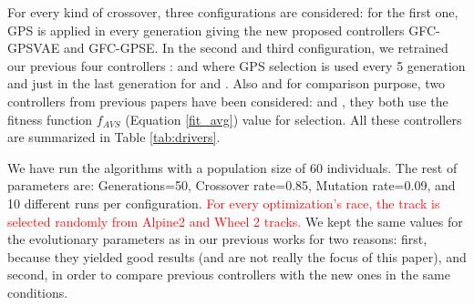 \documentclass[10pt,journal,compsoc]{IEEEtran}
\begin{document}
For every kind of crossover, three configurations are considered: for
the first one, GPS is applied in every generation giving the new
proposed controllers {\sf GFC-GPSVAE} and {\sf GFC-GPSE}. 
In the second and third configuration, we retrained our previous four  controllers \cite{DBLP:conf/cig/SalemMG19}: {} and 
{} where GPS selection is used every 5 generation and just in the last generation for {} and {}.
Also and for comparison purpose, two controllers from previous papers have been considered: {}\cite{DBLP:conf/cig/SalemMG19} and {}\cite{salem_cig2018}, they both use the fitness function $f_{AVS}$ (Equation \ref{fit_avg}) value for selection.
All these controllers are summarized in Table \ref{tab:drivers}. 

We have run the algorithms with a population size of 60
individuals. The rest of parameters are: Generations=50, Crossover
rate=0.85, Mutation rate=0.09, and 10 different runs per
configuration. %
               \textcolor{red}{
For every optimization's race, the track is selected randomly from Alpine2 and Wheel 2 tracks.}
We kept the same values for the evolutionary parameters as in our previous works for two reasons: first, because they yielded good results (and are not really the focus of this paper), and second, in order to compare previous controllers with the new ones in the same conditions.
\end{document}
